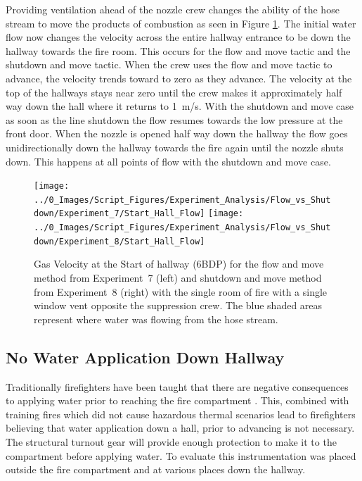\documentclass[12pt,oneside]{book}
\begin{document}
Providing ventilation ahead of the nozzle crew changes the ability of the hose stream to move the products of combustion as seen in Figure \ref{fig:Flow_vs_Shut_Single_Vent_Velocity}. The initial water flow now changes the velocity across the entire hallway entrance to be down the hallway towards the fire room. This occurs for the flow and move tactic and the shutdown and move tactic. When the crew uses the flow and move tactic to advance, the velocity trends toward to zero as they advance. The velocity at the top of the hallways stays near zero until the crew makes it approximately half way down the hall where it returns to 1~m/s. With the shutdown and move case as soon as the line shutdown the flow resumes towards the low pressure at the front door. When the nozzle is opened half way down the hallway the flow goes unidirectionally down the hallway towards the fire again until the nozzle shuts down. This happens at all points of flow with the shutdown and move case.

\begin{figure}[H]
\centering
\texttt{[image: ../0\_Images/Script\_Figures/Experiment\_Analysis/Flow\_vs\_Shutdown/Experiment\_7/Start\_Hall\_Flow]}
\texttt{[image: ../0\_Images/Script\_Figures/Experiment\_Analysis/Flow\_vs\_Shutdown/Experiment\_8/Start\_Hall\_Flow]}
\caption[Airflow - Single Vent - Flow \& Move vs. Shutdown \& Move]{Gas Velocity at the Start of hallway (6BDP) for the flow and move method from Experiment~7 (left) and shutdown and move method from Experiment~8 (right) with the single room of fire with a single window vent opposite the suppression crew. The blue shaded areas represent where water was flowing from the hose stream.}
\label{fig:Flow_vs_Shut_Single_Vent_Velocity}
\end{figure}

\subsection{No Water Application Down Hallway}
Traditionally firefighters have been taught that there are negative consequences to applying water prior to reaching the fire compartment \cite{Stowell_Essentials6} \cite{JandB:Firefighter_Skills} \cite{Delmar:Firefighters_Handbook} \cite{Corbett_FE_FFI_FFII}. This, combined with training fires which did not cause hazardous thermal scenarios lead to firefighters believing that water application down a hall, prior to advancing is not necessary. The structural turnout gear will provide enough protection to make it to the compartment before applying water. To evaluate this instrumentation was placed outside the fire compartment and at various places down the hallway.
\end{document}
